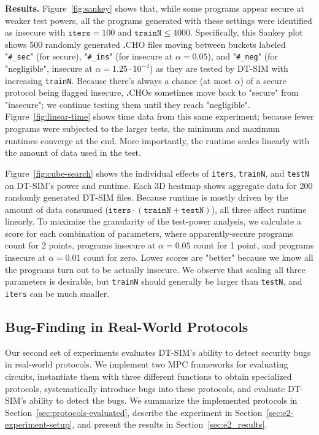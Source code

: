 \documentclass[compsoc, conference, a4paper, 10pt, times]{IEEEtran}
\renewcommand{\paragraph}[1]{\vspace*{2pt}\noindent\textbf{#1}}
\newcommand{\langname}{\textsc{\textbf{.}CHO}\xspace}
\newcommand{\toolname}{\textsc{DT-SIM}\xspace}
\begin{document}
\paragraph{Results.}
Figure~\ref{fig:sankey} shows that, while some programs appear secure at weaker test powers,
all the programs generated with these settings were identified as insecure with $\texttt{iters}=100$ and $\texttt{trainN}\leq4000$.
Specifically, this Sankey plot shows 500 randomly generated \langname files moving between buckets labeled
"\texttt{\#\_sec}" (for secure),
"\texttt{\#\_ins}" (for insecure at $\alpha=0.05$),
and "\texttt{\#\_neg}" (for "negligible", insecure at $\alpha=1.25 \cdot 10^{-4}$)
as they are tested by \toolname with increasing \texttt{trainN}.
Because there's always a chance (at most $\alpha$) of a secure protocol being flagged insecure,
\langname{}s sometimes move back to "secure" from "insecure"; we continue testing them until they reach "negligible".
Figure~\ref{fig:linear-time} shows time data from this same experiment;
because fewer programs were subjected to the larger tests, the minimum and maximum runtimes converge at the end.
More importantly, the runtime scales linearly with the amount of data used in the test.

Figure~\ref{fig:cube-search} shows the individual effects of \texttt{iters}, \texttt{trainN}, and \texttt{testN} on \toolname's power and runtime.
Each 3D heatmap shows aggregate data for 200 randomly generated \toolname files.
Because runtime is mostly driven by the amount of data consumed ($\texttt{iters} \cdot (\texttt{trainN} + \texttt{testN})$),
all three affect runtime linearly.
To maximize the granularity of the test-power analysis, we calculate a score for each combination of parameters,
where apparently-secure programs count for 2 points,
programs insecure at $\alpha=0.05$ count for 1 point,
and programs insecure at $\alpha=0.01$ count for zero.
Lower scores are "better" because we know all the programs turn out to be actually insecure.
We observe that scaling all three parameters is desirable,
but \texttt{trainN} should generally be larger than \texttt{testN},
and \texttt{iters} can be much smaller.


\subsection{Bug-Finding in Real-World Protocols}
\label{sec:case-study-protocols}

Our second set of experiments evaluates \toolname's ability to detect security bugs in real-world protocols. We implement two MPC frameworks for evaluating circuits, instantiate them with three different functions to obtain specialized protocols, systematically introduce bugs into these protocols, and evaluate \toolname's ability to detect the bugs. We summarize the implemented protocols in Section~\ref{sec:protocols-evaluated}, describe the experiment in Section~\ref{sec:e2-experiment-setup}, and present the results in Section~\ref{sec:e2_results}.
\end{document}
